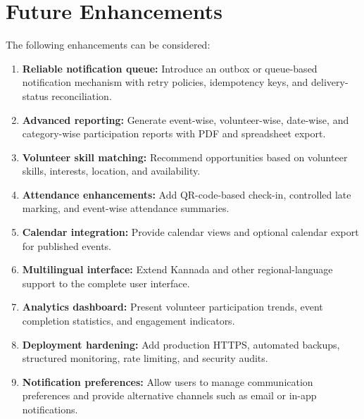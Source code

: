 \documentclass[12pt,a4paper,oneside]{report}
\begin{document}
\section{Future Enhancements}
The following enhancements can be considered:
\begin{enumerate}[label=\arabic*.]
  \item \textbf{Reliable notification queue:} Introduce an outbox or queue-based notification mechanism with retry policies, idempotency keys, and delivery-status reconciliation.
  \item \textbf{Advanced reporting:} Generate event-wise, volunteer-wise, date-wise, and category-wise participation reports with PDF and spreadsheet export.
  \item \textbf{Volunteer skill matching:} Recommend opportunities based on volunteer skills, interests, location, and availability.
  \item \textbf{Attendance enhancements:} Add QR-code-based check-in, controlled late marking, and event-wise attendance summaries.
  \item \textbf{Calendar integration:} Provide calendar views and optional calendar export for published events.
  \item \textbf{Multilingual interface:} Extend Kannada and other regional-language support to the complete user interface.
  \item \textbf{Analytics dashboard:} Present volunteer participation trends, event completion statistics, and engagement indicators.
  \item \textbf{Deployment hardening:} Add production HTTPS, automated backups, structured monitoring, rate limiting, and security audits.
  \item \textbf{Notification preferences:} Allow users to manage communication preferences and provide alternative channels such as email or in-app notifications.
\end{enumerate}
\end{document}
